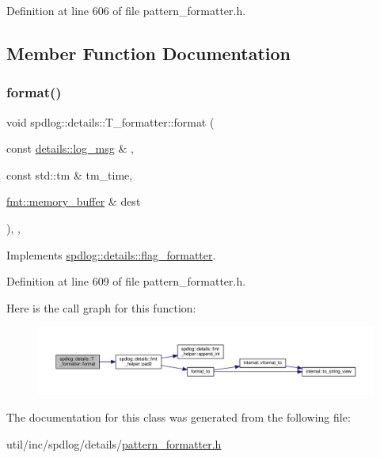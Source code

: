 Definition at line 606 of file pattern\+\_\+formatter.\+h.



\subsection{Member Function Documentation}
\mbox{\label{classspdlog_1_1details_1_1_t__formatter_a338d37f02f3a9a4376acc3d4b655eda3}} 
\subsubsection{\texorpdfstring{format()}{format()}}
{\footnotesize\ttfamily void spdlog\+::details\+::\+T\+\_\+formatter\+::format (\begin{DoxyParamCaption}\item[{const \hyperlink{structspdlog_1_1details_1_1log__msg}{details\+::log\+\_\+msg} \&}]{,  }\item[{const std\+::tm \&}]{tm\+\_\+time,  }\item[{\hyperlink{format_8h_a21cbf729f69302f578e6db21c5e9e0d2}{fmt\+::memory\+\_\+buffer} \&}]{dest }\end{DoxyParamCaption})\hspace{0.3cm}{\ttfamily [inline]}, {\ttfamily [override]}, {\ttfamily [virtual]}}



Implements \hyperlink{classspdlog_1_1details_1_1flag__formatter_a33fb3e42a4c8200cceb833d92b53fb67}{spdlog\+::details\+::flag\+\_\+formatter}.



Definition at line 609 of file pattern\+\_\+formatter.\+h.

Here is the call graph for this function\+:
\nopagebreak
\begin{figure}[H]
\begin{center}
\leavevmode
\includegraphics[width=350pt]{classspdlog_1_1details_1_1_t__formatter_a338d37f02f3a9a4376acc3d4b655eda3_cgraph}
\end{center}
\end{figure}


The documentation for this class was generated from the following file\+:\begin{DoxyCompactItemize}
\item 
util/inc/spdlog/details/\hyperlink{pattern__formatter_8h}{pattern\+\_\+formatter.\+h}\end{DoxyCompactItemize}
